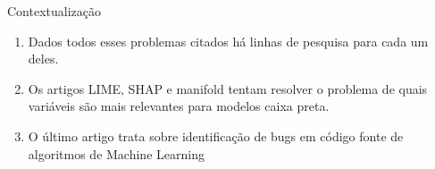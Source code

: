 \begin{frame}
	\begin{block}{Contextualização}
		\begin{enumerate}
			\item Dados todos esses problemas citados há linhas de pesquisa para cada um deles.
			\item Os artigos LIME, SHAP e manifold tentam resolver o problema de quais variáveis são mais relevantes para modelos caixa preta.
			\item O último artigo trata sobre identificação de bugs em código fonte de algoritmos de Machine Learning
		\end{enumerate}
	\end{block}
\end{frame}

